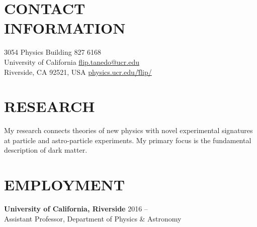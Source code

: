 \documentclass[margin,line]{resume}
\begin{document}
\begin{resume}





\section{\footnotesize \sc
\sffamily 
{}CONTACT\\INFORMATION
}

3054 Physics Building
\hfill 
{ 827 6168}
\vspace{0mm}%
\\
%
\vspace{0mm}%
University of California
\hfill
\href{mailto:flip.tanedo@ucr.edu}{\myweb flip.tanedo@ucr.edu}
\vspace{0mm}%
\\
\vspace{0mm}%
Riverside, CA 92521, USA
\hfill
\href{http://physics.ucr.edu/~flip/}{\myweb physics.ucr.edu/\~flip/}
\vspace{0mm}%
\\
\vspace{-4.5mm}%
\vspace{-2mm}





\section{\footnotesize \sc \sffamily 
{}RESEARCH}


My research connects theories of new physics with novel experimental signatures at particle and astro-particle experiments. My primary focus is the fundamental description of dark matter.

\vspace{-3mm}






\section{\footnotesize \sc
\sffamily 
{}EMPLOYMENT
}

\textbf{University of California, Riverside} 
\hfill 
\textsf{ 2016 -- \phantom{2016} }
\\
Assistant Professor, Department of Physics \& Astronomy



\end{resume}
\end{document}
